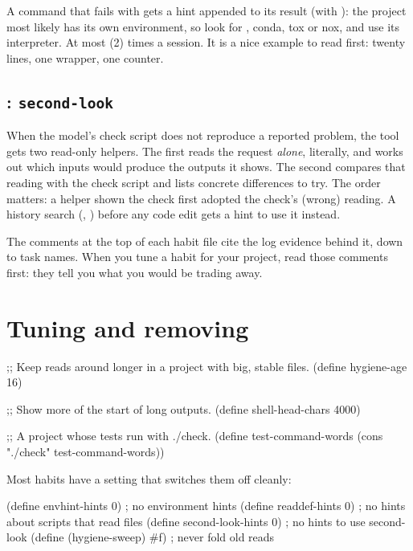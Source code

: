 A command that fails with  gets a hint
appended to its result (with ): the project most likely
has its own environment, so look for , conda, tox or nox, and
use its interpreter. At most  (2) times a session. It is
a nice example to read first: twenty lines, one wrapper, one counter.

\subsection{: \texttt{second-look}}

When the model's check script does not reproduce a reported problem, the
tool  gets two read-only helpers. The first reads the
request \emph{alone}, literally, and works out which inputs would produce
the outputs it shows. The second compares that reading with the check
script and lists concrete differences to try. The order matters: a helper
shown the check first adopted the check's (wrong) reading. A history search
(, ) before any code edit gets a hint to use
it instead.

\begin{tip}
The comments at the top of each habit file cite the log evidence behind
it, down to task names. When you tune a habit for your project, read those
comments first: they tell you what you would be trading away.
\end{tip}

\section{Tuning and removing}

\begin{scm}
;; Keep reads around longer in a project with big, stable files.
(define hygiene-age 16)

;; Show more of the start of long outputs.
(define shell-head-chars 4000)

;; A project whose tests run with ./check.
(define test-command-words (cons "./check" test-command-words))
\end{scm}

Most habits have a setting that switches them off cleanly:

\begin{scm}
(define envhint-hints 0)        ; no environment hints
(define readdef-hints 0)        ; no hints about scripts that read files
(define second-look-hints 0)    ; no hints to use second-look
(define (hygiene-sweep) #f)     ; never fold old reads
\end{scm}

